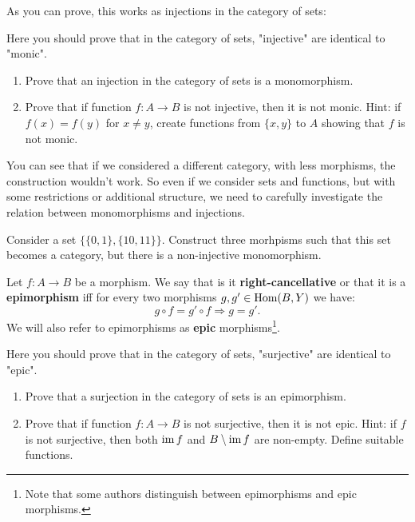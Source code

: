 As you can prove, this works as injections in the category of sets:

\begin{exercise}
  Here you should prove that in the category of sets, "injective" are identical to "monic".
  \begin{enumerate}
    \item Prove that an injection in the category of sets is a monomorphism.
    \item Prove that if function $f: A\to B$ is not injective, then it is not monic. Hint: if $f(x)=f(y)$ for $x\neq y$, create functions from $\{x,y\}$ to $A$ showing that $f$ is not monic.
  \end{enumerate}
\end{exercise}

You can see that if we considered a different category, with less morphisms, the construction wouldn't work. So even if we consider sets and functions, but with some restrictions or additional structure,
we need to carefully investigate the relation between monomorphisms and injections.

\begin{exercise}
  Consider a set $\{\{0,1\}, \{10,11\}\}$. Construct three morhpisms such that this set becomes a category, but there is a non-injective monomorphism.
\end{exercise}

\begin{definition}
  Let $f: A\to B$ be a morphism. We say that is it \textbf{right-cancellative} or that it is a \textbf{epimorphism} iff for every two morphisms $g,g' \in \text{Hom}(B,Y)$ we have:
  $$g\circ f = g'\circ f\Rightarrow g=g'.$$
  We will also refer to epimorphisms as \textbf{epic} morphisms\footnote{Note that some authors distinguish between epimorphisms and epic morphisms.}.
\end{definition}

\begin{exercise}
  Here you should prove that in the category of sets, "surjective" are identical to "epic".
  \begin{enumerate}
    \item Prove that a surjection in the category of sets is an epimorphism.
    \item Prove that if function $f: A\to B$ is not surjective, then it is not epic. Hint: if $f$ is not surjective, then both $\text{im\,} f$ and $B\setminus \text{im\,} f$ are non-empty. Define suitable functions.
  \end{enumerate}
\end{exercise}

